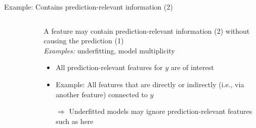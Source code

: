 \documentclass[11pt,compress,t,notes=noshow, aspectratio=169, xcolor=table]{beamer}
\begin{document}
\begin{frame}[c]{Example: Contains prediction-relevant information (2)}
\begin{columns}[c]
\begin{column}{0.5\textwidth}
\begin{figure}
\end{figure} 
  \end{column}
  \begin{column}{0.5\textwidth}
  A feature may contain prediction-relevant information (2) without causing the prediction (1)\\ 
  \textit{Examples:} underfitting, model multiplicity
  \lz
  \pause
      \begin{itemize}
      \item All prediction-relevant features for $y$ are of interest
      \item Example: All features that are directly or indirectly (i.e., via another feature) connected to $y$ 
      \item[$\Rightarrow$] Underfitted models may ignore prediction-relevant features such as  here
  \end{itemize}
  \end{column}
\end{columns}
\end{frame}
\end{document}
